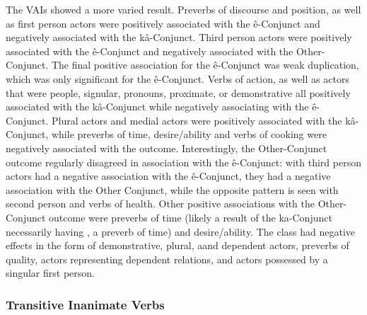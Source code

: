 The VAIs showed a more varied result. Preverbs of discourse and position, as well as first person actors were positively associated with the ê-Conjunct and negatively associated with the kâ-Conjunct. Third person actors were positively associated with the ê-Conjunct and negatively associated with the Other-Conjunct. The final positive association for the ê-Conjunct was weak duplication, which was only significant for the ê-Conjunct. Verbs of action, as well as actors that were people, signular, pronouns, proximate, or demonstrative all positively associated with the kâ-Conjunct while negatively associating with the ê-Conjunct. Plural actors and medial actors were positively associated with the kâ-Conjunct, while preverbs of time, desire/ability and verbs of cooking were negatively associated with the outcome. Interestingly, the Other-Conjunct outcome regularly disagreed in association with the ê-Conjunct: with third person actors had a negative association with the ê-Conjunct, they had a negative association with the Other Conjunct, while the opposite pattern is seen with second person and verbs of health. Other positive associations with the Other-Conjunct outcome were preverbs of time (likely a result of the ka-Conjunct necessarily having , a preverb of time) and desire/ability. The class had negative effects in the form of demonstrative, plural, aand dependent actors, preverbs of quality, actors representing dependent relations, and actors possessed by a singular first person. 
\FloatBarrier


\FloatBarrier

\subsubsection{Transitive Inanimate Verbs}

